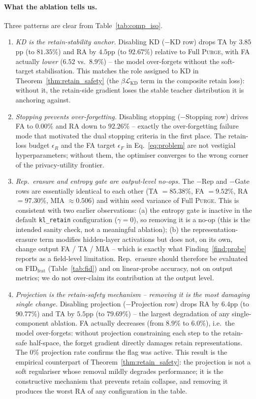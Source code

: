 \documentclass{article}
\newcommand{\ours}{\textsc{Purge}}
\newcommand{\klr}{\texttt{kl\_retain}}
\newcommand{\losskd}{\mathcal{L}_{\mathrm{KD}}}
\begin{document}
{\paragraph{What the ablation tells us.} Three patterns are clear from Table~\ref{tab:comp_iso}.
\begin{enumerate}[nosep,leftmargin=*]
\item \emph{KD is the retain-stability anchor.} Disabling KD ($-$KD row) drops TA by $3.85$pp (to $81.35$\%) and RA by $4.5$pp (to $92.67$\%) relative to Full \ours{}, with FA actually \emph{lower} ($6.52$ vs.\ $8.9$\%) -- the model over-forgets without the soft-target stabilisation. This matches the role assigned to KD in Theorem~\ref{thm:retain_safety} (the $\beta\losskd$ term in the composite retain loss): without it, the retain-side gradient loses the stable teacher distribution it is anchoring against.
\item \emph{Stopping prevents over-forgetting.} Disabling stopping ($-$Stopping row) drives FA to $0.00$\% and RA down to $92.26$\% -- exactly the over-forgetting failure mode that motivated the dual stopping criteria in the first place. The retain-loss budget $\epsilon_R$ and the FA target $\epsilon_F$ in Eq.~\ref{eq:problem} are not vestigial hyperparameters; without them, the optimiser converges to the wrong corner of the privacy-utility frontier.
\item \emph{Rep.\ erasure and entropy gate are output-level no-ops.} The $-$Rep and $-$Gate rows are essentially identical to each other (TA $= 85.38$\%, FA $= 9.52$\%, RA $= 97.30$\%, MIA $\approx 0.506$) and within seed variance of Full \ours{}. This is consistent with two earlier observations: (a) the entropy gate is inactive in the default \klr{} configuration ($\gamma = 0$), so removing it is a no-op (this is the intended sanity check, not a meaningful ablation); (b) the representation-erasure term modifies hidden-layer activations but does not, on its own, change output FA / TA / MIA -- which is exactly what Finding~\ref{find:probe} reports as a field-level limitation. Rep.\ erasure should therefore be evaluated on FID$_{\text{feat}}$ (Table~\ref{tab:fid}) and on linear-probe accuracy, not on output metrics; we do not over-claim its contribution at the output level.
\item \emph{Projection is the retain-safety mechanism -- removing it is the most damaging single change.} Disabling projection ($-$Projection row) drops RA by $6.4$pp (to $90.77$\%) and TA by $5.5$pp (to $79.69$\%) -- the largest degradation of any single-component ablation. FA actually decreases (from $8.9$\% to $6.0$\%), i.e.\ the model over-forgets: without projection constraining each step to the retain-safe half-space, the forget gradient directly damages retain representations. The $0$\% projection rate confirms the flag was active. This result is the empirical counterpart of Theorem~\ref{thm:retain_safety}: the projection is not a soft regulariser whose removal mildly degrades performance; it is the constructive mechanism that prevents retain collapse, and removing it produces the worst RA of any configuration in the table.

\end{enumerate}}
\end{document}
